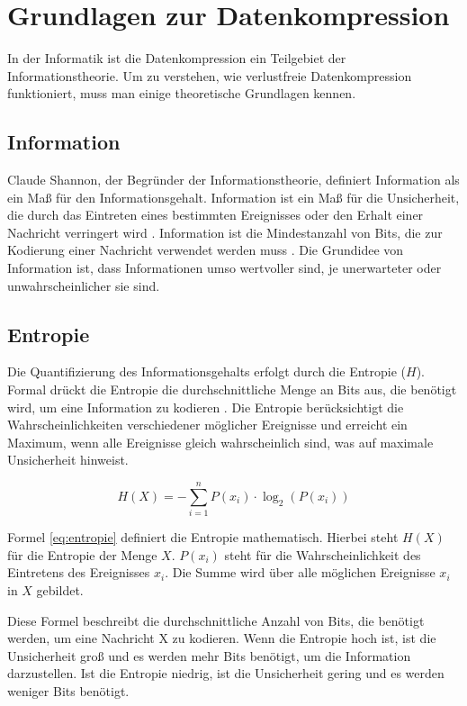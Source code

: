 \documentclass[conference]{IEEEtran}
\begin{document}
\section{Grundlagen zur Datenkompression}

In der Informatik ist die Datenkompression ein Teilgebiet der Informationstheorie. 
Um zu verstehen, wie verlustfreie Datenkompression funktioniert, muss man einige 
theoretische Grundlagen kennen.

\subsection{Information}

Claude Shannon, der Begründer der Informationstheorie, definiert Information 
als ein Maß für den Informationsgehalt. 
Information ist ein Maß für die Unsicherheit, die durch das Eintreten eines bestimmten 
Ereignisses oder den Erhalt einer Nachricht verringert wird \cite{shannon}.  
Information ist die Mindestanzahl von Bits, die zur Kodierung einer Nachricht verwendet 
werden muss \cite{shannon2}.  
Die Grundidee von Information ist, dass Informationen umso wertvoller sind, je 
unerwarteter oder unwahrscheinlicher sie sind.


\subsection{Entropie}

Die Quantifizierung des Informationsgehalts erfolgt durch die Entropie ($H$).
Formal drückt die Entropie die durchschnittliche Menge an Bits aus,
die benötigt wird, um eine Information zu kodieren \cite{shannon}. 
Die Entropie berücksichtigt die Wahrscheinlichkeiten verschiedener möglicher
Ereignisse und erreicht ein Maximum, wenn alle Ereignisse gleich wahrscheinlich sind,
was auf maximale Unsicherheit hinweist.

\begin{equation}
  \label{eq:entropie}
  H(X) = -\sum_{i=1}^{n} P(x_i) \cdot \log_{2}(P(x_i))
\end{equation}

Formel \ref{eq:entropie} definiert die Entropie mathematisch.
Hierbei steht $H(X)$ für die Entropie der Menge $X$.
$P(x_i)$ steht für die Wahrscheinlichkeit des
Eintretens des Ereignisses $x_i$.
Die Summe wird über alle möglichen Ereignisse
$x_i$ in $X$ gebildet.

Diese Formel beschreibt die durchschnittliche Anzahl von Bits, die 
benötigt werden, um eine Nachricht X zu kodieren.
Wenn die Entropie hoch ist, ist die Unsicherheit groß und es werden mehr 
Bits benötigt, um die Information darzustellen. 
Ist die Entropie niedrig, ist die Unsicherheit gering und es werden weniger 
Bits benötigt. 
\end{document}
